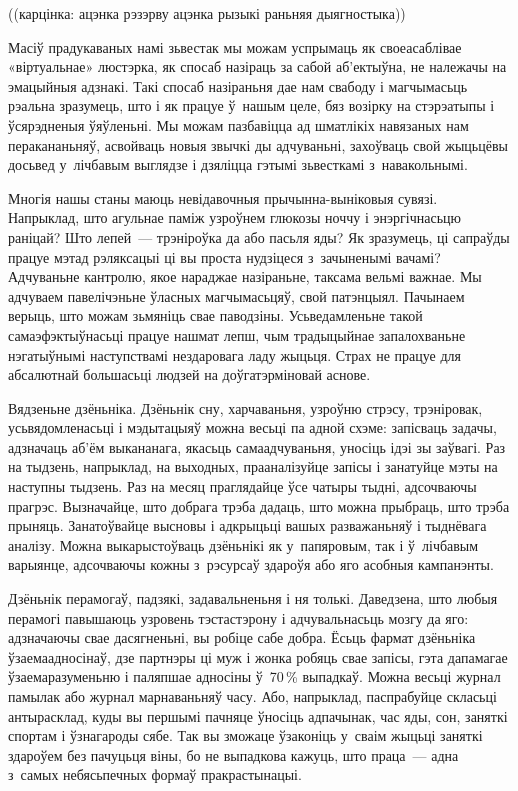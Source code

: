 ((карцінка: ацэнка рэзэрву ацэнка рызыкі раньняя дыягностыка))

Масіў прадукаваных намі зьвестак мы можам успрымаць як своеасаблівае «віртуальнае» люстэрка, як спосаб назіраць за сабой аб'ектыўна, не належачы на эмацыйныя адзнакі. Такі спосаб назіраньня дае нам свабоду і магчымасьць рэальна зразумець, што і як працуе ў~нашым целе, бяз возірку на стэрэатыпы і ўсярэдненыя ўяўленьні. Мы можам пазбавіцца ад шматлікіх навязаных нам перакананьняў, асвойваць новыя звычкі ды адчуваньні, захоўваць свой жыцьцёвы досьвед у~лічбавым выглядзе і дзяліцца гэтымі зьвесткамі з~навакольнымі.

Многія нашы станы маюць невідавочныя прычынна-выніковыя сувязі. Напрыклад, што агульнае паміж узроўнем глюкозы ноччу і энэргічнасьцю раніцай? Што лепей~--- трэніроўка да або пасьля яды? Як зразумець, ці сапраўды працуе мэтад рэляксацыі ці вы проста нудзіцеся з~зачыненымі вачамі? Адчуваньне кантролю, якое нараджае назіраньне, таксама вельмі важнае. Мы адчуваем павелічэньне ўласных магчымасьцяў, свой патэнцыял. Пачынаем верыць, што можам зьмяніць свае паводзіны. Усьведамленьне такой самаэфэктыўнасьці працуе нашмат лепш, чым традыцыйнае запалохваньне нэгатыўнымі наступствамі нездаровага ладу жыцьця. Страх не працуе для абсалютнай большасьці людзей на доўгатэрміновай аснове.

Вядзеньне дзёньніка. Дзёньнік сну, харчаваньня, узроўню стрэсу, трэніровак, усьвядомленасьці і мэдытацыяў можна весьці па адной схэме: запісваць задачы, адзначаць аб'ём выкананага, якасьць самаадчуваньня, уносіць ідэі зы заўвагі. Раз на тыдзень, напрыклад, на выходных, прааналізуйце запісы і занатуйце мэты на наступны тыдзень. Раз на месяц праглядайце ўсе чатыры тыдні, адсочваючы прагрэс. Вызначайце, што добрага трэба дадаць, што можна прыбраць, што трэба прыняць. Занатоўвайце высновы і адкрыцьці вашых разважаньняў і тыднёвага аналізу. Можна выкарыстоўваць дзёньнікі як у~папяровым, так і ў~лічбавым варыянце, адсочваючы кожны з~рэсурсаў здароўя або яго асобныя кампанэнты.

Дзёньнік перамогаў, падзякі, задавальненьня і ня толькі. Даведзена, што любыя перамогі павышаюць узровень тэстастэрону і адчувальнасьць мозгу да яго: адзначаючы свае дасягненьні, вы робіце сабе добра. Ёсьць фармат дзёньніка ўзаемаадносінаў, дзе партнэры ці муж і жонка робяць свае запісы, гэта дапамагае ўзаемаразуменьню і паляпшае адносіны ў~70\,\% выпадкаў. Можна весьці журнал памылак або журнал марнаваньняў часу. Або, напрыклад, паспрабуйце скласьці антырасклад, куды вы першымі пачняце ўносіць адпачынак, час яды, сон, заняткі спортам і ўзнагароды сябе. Так вы зможаце ўзаконіць у~сваім жыцьці заняткі здароўем без пачуцьця віны, бо не выпадкова кажуць, што праца~--- адна з~самых небясьпечных формаў пракрастынацыі.

